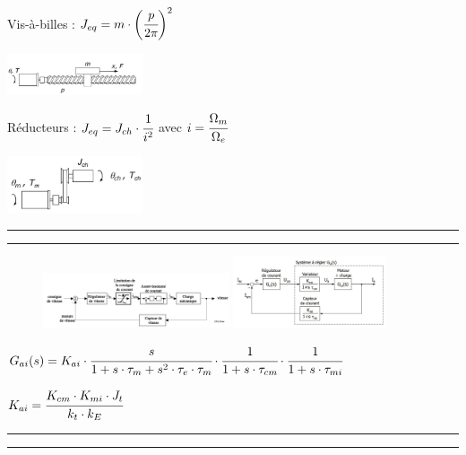 \documentclass[	DIV=calc,%
							paper=a4,%
							fontsize=10pt,%
							twocolumn]{scrartcl} %
\newcommand{\hformbar}[1]{\bigskip \hrule \vspace{1pt} \hrule \vspace{5pt}} %
\newcounter{mycounter}
\newcommand{\formdesc}[1]{\large\textbf{#1} \addtocounter{mycounter}{1} \hfill \themycounter \\ \vspace{-3mm} \hrule \vspace{2mm}}
\begin{document}
\vspace{1cm}

Vis-à-billes : $J_{eq} = m \cdot \biggl(\cfrac{p}{2\pi}\biggr)^2$

{\centering \includegraphics[width = 0.3\textwidth]{img/vis.JPG}}

Réducteurs : $J_{eq} = J_{ch}\cdot \cfrac{1}{i^2} $ \quad avec $ i = \cfrac{\Omega_m}{\Omega_e}$ 

{\centering \includegraphics[width = 0.3\textwidth]{img/Reducteur.JPG}}

\hformbar

\formdesc{Réglage du courant / couple}
\begin{figure}[H]
    \begin{center}
        \includegraphics[width = 0.49\textwidth]{img/Regulation_courrant.JPG}

        \includegraphics[width = 0.4\textwidth]{img/Regulation_courrant_Gai.JPG}

    \end{center}
\end{figure}

{\footnotesize $G_{ai}(s) = K_{ai} \cdot \cfrac{s}{1+s \cdot \tau_m + s^2 \cdot \tau_e \cdot \tau_m} \cdot \cfrac{1}{1+s \cdot \tau_{cm}}\cdot \cfrac{1}{1+s \cdot \tau_{mi}} $}

\vspace{3mm}

{\footnotesize$K_{ai} = \cfrac{K_{cm} \cdot K_{mi} \cdot J_t}{k_t \cdot k_E}$}

\hformbar

\formdesc{Régulateur PI}
\end{document}
